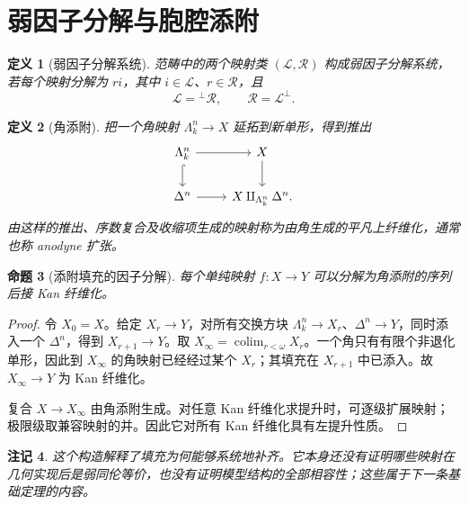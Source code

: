 \documentclass[12pt,oneside,openany,fontset=none]{ctexbook}
\theoremstyle{cn}
\newtheorem{definition}{定义}[chapter]
\newtheorem{proposition}[definition]{命题}
\newtheorem{remark}[definition]{注记}
\numberwithin{equation}{chapter}
\newcommand{\colim}{\operatorname*{colim}}
\begin{document}
\section{弱因子分解与胞腔添附}
\begin{definition}[弱因子分解系统]
范畴中的两个映射类 $(\mathcal L,\mathcal R)$ 构成弱因子分解系统，若每个映射分解为 $ri$，其中 $i\in\mathcal L$、$r\in\mathcal R$，且
\[
\mathcal L={}^\perp\mathcal R,
\qquad \mathcal R=\mathcal L^\perp.
\]
\end{definition}
\begin{definition}[角添附]
把一个角映射 $\Lambda_k^n\to X$ 延拓到新单形，得到推出
\[
\begin{tikzcd}
\Lambda_k^n\ar[r]\ar[d,hook]&X\ar[d]\\
\Delta^n\ar[r]&X\amalg_{\Lambda_k^n}\Delta^n.
\end{tikzcd}
\]
由这样的推出、序数复合及收缩项生成的映射称为由角生成的平凡上纤维化，通常也称 anodyne 扩张。
\end{definition}
\begin{proposition}[添附填充的因子分解]
每个单纯映射 $f:X\to Y$ 可以分解为角添附的序列后接 Kan 纤维化。
\end{proposition}
\begin{proof}
令 $X_0=X$。给定 $X_r\to Y$，对所有交换方块 $\Lambda_k^n\to X_r$、$\Delta^n\to Y$，同时添入一个 $\Delta^n$，得到 $X_{r+1}\to Y$。取 $X_\infty=\colim_{r<\omega}X_r$。一个角只有有限个非退化单形，因此到 $X_\infty$ 的角映射已经经过某个 $X_r$；其填充在 $X_{r+1}$ 中已添入。故 $X_\infty\to Y$ 为 Kan 纤维化。

复合 $X\to X_\infty$ 由角添附生成。对任意 Kan 纤维化求提升时，可逐级扩展映射；极限级取兼容映射的并。因此它对所有 Kan 纤维化具有左提升性质。
\end{proof}
\begin{remark}
这个构造解释了填充为何能够系统地补齐。它本身还没有证明哪些映射在几何实现后是弱同伦等价，也没有证明模型结构的全部相容性；这些属于下一条基础定理的内容。
\end{remark}
\end{document}
